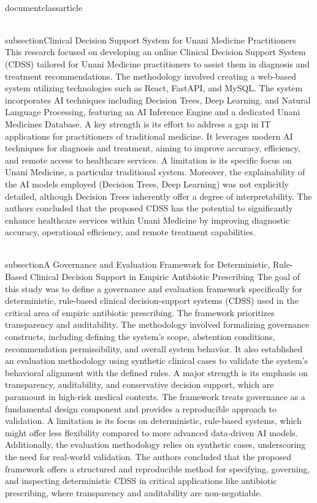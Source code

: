 \\documentclass{article}
\begin{document}
\\subsection{Clinical Decision Support System for Unani Medicine Practitioners}
This research focused on developing an online Clinical Decision Support System (CDSS) tailored for Unani Medicine practitioners to assist them in diagnosis and treatment recommendations. The methodology involved creating a web-based system utilizing technologies such as React, FastAPI, and MySQL. The system incorporates AI techniques including Decision Trees, Deep Learning, and Natural Language Processing, featuring an AI Inference Engine and a dedicated Unani Medicines Database. A key strength is its effort to address a gap in IT applications for practitioners of traditional medicine. It leverages modern AI techniques for diagnosis and treatment, aiming to improve accuracy, efficiency, and remote access to healthcare services. A limitation is its specific focus on Unani Medicine, a particular traditional system. Moreover, the explainability of the AI models employed (Decision Trees, Deep Learning) was not explicitly detailed, although Decision Trees inherently offer a degree of interpretability. The authors concluded that the proposed CDSS has the potential to significantly enhance healthcare services within Unani Medicine by improving diagnostic accuracy, operational efficiency, and remote treatment capabilities.

\\subsection{A Governance and Evaluation Framework for Deterministic, Rule-Based Clinical Decision Support in Empiric Antibiotic Prescribing}
The goal of this study was to define a governance and evaluation framework specifically for deterministic, rule-based clinical decision-support systems (CDSS) used in the critical area of empiric antibiotic prescribing. The framework prioritizes transparency and auditability. The methodology involved formalizing governance constructs, including defining the system's scope, abstention conditions, recommendation permissibility, and overall system behavior. It also established an evaluation methodology using synthetic clinical cases to validate the system's behavioral alignment with the defined rules. A major strength is its emphasis on transparency, auditability, and conservative decision support, which are paramount in high-risk medical contexts. The framework treats governance as a fundamental design component and provides a reproducible approach to validation. A limitation is its focus on deterministic, rule-based systems, which might offer less flexibility compared to more advanced data-driven AI models. Additionally, the evaluation methodology relies on synthetic cases, underscoring the need for real-world validation. The authors concluded that the proposed framework offers a structured and reproducible method for specifying, governing, and inspecting deterministic CDSS in critical applications like antibiotic prescribing, where transparency and auditability are non-negotiable.
\end{document}
